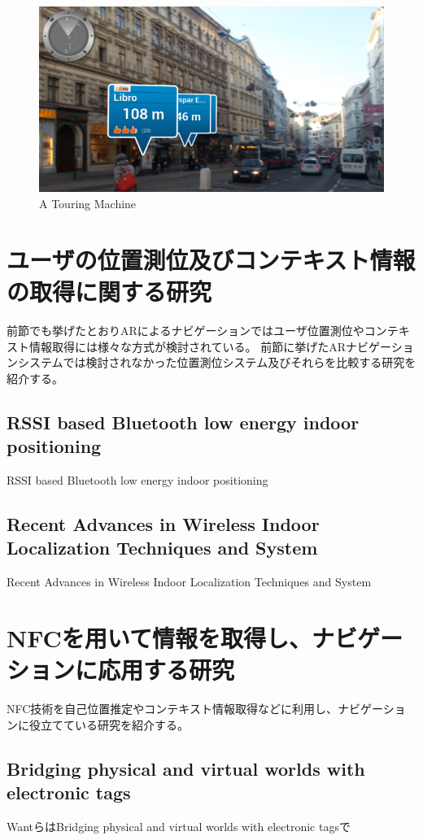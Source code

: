 \begin{figure}[h]
  \centering 
  \includegraphics[width=150mm]{images/Wikitude.png}
  \caption{A Touring Machine} \label{fig:Wikitude}
\end{figure}



\section{ユーザの位置測位及びコンテキスト情報の取得に関する研究}
前節でも挙げたとおりARによるナビゲーションではユーザ位置測位やコンテキスト情報取得には様々な方式が検討されている。
前節に挙げたARナビゲーションシステムでは検討されなかった位置測位システム及びそれらを比較する研究を紹介する。


\subsection{RSSI based Bluetooth low energy indoor positioning}
RSSI based Bluetooth low energy indoor positioning\cite{7275525}


\subsection{Recent Advances in Wireless Indoor Localization Techniques and System}
Recent Advances in Wireless Indoor Localization Techniques and System\cite{Farid2013}


\section{NFCを用いて情報を取得し、ナビゲーションに応用する研究}
NFC技術を自己位置推定やコンテキスト情報取得などに利用し、ナビゲーションに役立てている研究を紹介する。

\subsection{Bridging physical and virtual worlds with electronic tags}
WantらはBridging physical and virtual worlds with electronic tags\cite{10.1145/302979.303111}で

